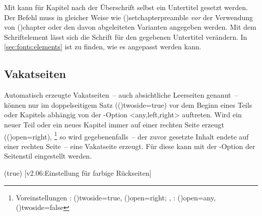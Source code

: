\begin{DeclareEntity*}{}
\begin{DeclareEntity*}{}
\begin{DeclareEntity*}{}
\begin{Declaration}
\begin{Declaration}
Mit  kann für Kapitel nach 
der Überschrift selbst ein Untertitel gesetzt werden. Der Befehl muss in 
gleicher Weise wie
\Macro(){setchapterpreamble} 
\emph{vor} der Verwendung von
\Macro(){chapter}
oder den davon abgeleiteten Varianten angegeben werden. Mit dem Schriftelement 
 lässt sich die Schrift für den gegebenen Untertitel 
verändern. In \autoref{sec:fonts:elements} ist zu finden, wie es angepasst 
werden kann.
\end{Declaration}
\end{Declaration}
%
%



\subsection{%
  Vakatseiten%
  \label{sec:vacat}%
}

Automatisch erzeugte Vakatseiten~-- auch absichtliche Leerseiten genannt~-- 
können nur im doppelseitigem Satz (\Option(){twoside=true}) 
vor dem Beginn eines Teils oder Kapitels abhängig von der \KOMAScript-Option 
<any,left,right> 
auftreten. Wird ein neuer Teil oder ein neues Kapitel immer auf einer rechten 
Seite erzeugt (\Option(){open=right}),%
\footnote{%
  Voreinstellungen
  : 
  \Option(){twoside=true}, 
  \Option(){open=right};
  , : 
  \Option(){open=any}, 
  \Option(){twoside=false}%
}
so wird gegebenenfalls~-- der zuvor gesetzte Inhalt endete auf einer rechten 
Seite~-- eine Vakatseite erzeugt. Für diese kann mit der \KOMAScript-Option 
der Seitenstil eingestellt werden.

\begin{Declaration}
  {}
  (true)
  [v2.06:Einstellung für farbige Rückseiten]


\end{Declaration}
\end{DeclareEntity*}
\end{DeclareEntity*}
\end{DeclareEntity*}
